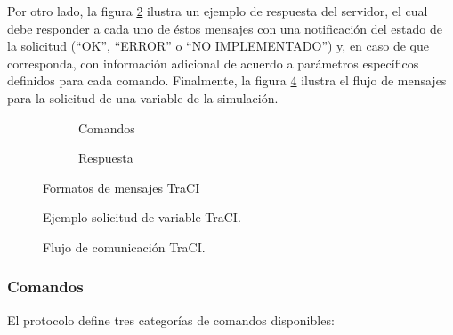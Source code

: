 Por otro lado, la figura \ref{fig:traci_msg:response} ilustra un ejemplo de respuesta del servidor, el cual debe responder a cada uno de éstos mensajes con una notificación del estado de la solicitud (``OK'', ``ERROR'' o ``NO IMPLEMENTADO'') y, en caso de que corresponda, con información adicional de acuerdo a parámetros específicos definidos para cada comando. Finalmente, la figura \ref{fig:tracigetversion} ilustra el flujo de mensajes para la solicitud de una variable de la simulación.

\begin{figure}[t]
    \begin{subfigure}{.3\textwidth}
        \centering
        
        \caption{Comandos}
        \label{fig:traci_msg:command}
    \end{subfigure}\hspace{0.2\textwidth}%
    \begin{subfigure}{.3\textwidth}
        \centering
        
        \caption{Respuesta}
        \label{fig:traci_msg:response}
    \end{subfigure}
    \caption{Formatos de mensajes TraCI}  
    \label{fig:traci_msg}  
\end{figure}

\begin{figure}
    \centering
    
    \caption{Ejemplo solicitud de variable TraCI.}
    \label{fig:tracigetversion}
\end{figure}

\begin{figure}
    \centering
    
    \caption{Flujo de comunicación TraCI.}
    \label{fig:traciflow}
\end{figure}


\subsubsection{Comandos}

El protocolo define tres categorías de comandos disponibles:

